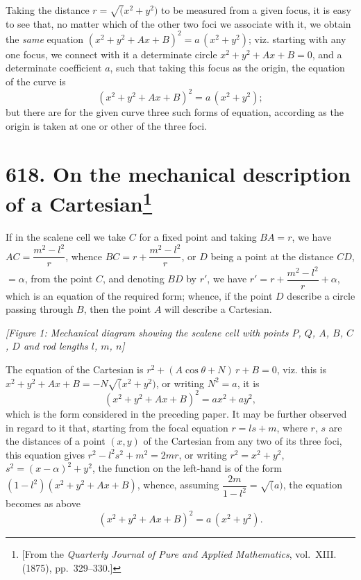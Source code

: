 \documentclass[11pt,a4paper]{article}
\theoremstyle{plain}
\theoremstyle{definition}
\theoremstyle{remark}
\begin{document}
Taking the distance $r = \surd(x^2+y^2)$ to be measured from a given focus, it is easy to see that, no matter which of the other two foci we associate with it, we obtain the \textit{same} equation $(x^2 + y^2 + Ax + B)^2 = a\,(x^2 + y^2)$; viz. starting with any one focus, we connect with it a determinate circle $x^2 + y^2 + Ax + B = 0$, and a determinate coefficient $a$, such that taking this focus as the origin, the equation of the curve is
\[
(x^2 + y^2 + Ax + B)^2 = a\,(x^2 + y^2);
\]
but there are for the given curve three such forms of equation, according as the origin is taken at one or other of the three foci.

\newpage
\section[On the mechanical description of a Cartesian]{\textbf{618.} On the mechanical description of a Cartesian\footnote{[From the \textit{Quarterly Journal of Pure and Applied Mathematics}, vol.~XIII. (1875), pp.~329--330.]}}

If in the scalene cell we take $C$ for a fixed point and taking $BA = r$, we have $AC = \dfrac{m^2-l^2}{r}$, whence $BC = r + \dfrac{m^2-l^2}{r}$, or $D$ being a point at the distance $CD$, $= \alpha$, from the point $C$, and denoting $BD$ by $r'$, we have $r' = r + \dfrac{m^2-l^2}{r} + \alpha$, which is an equation of the required form; whence, if the point $D$ describe a circle passing through $B$, then the point $A$ will describe a Cartesian.

\begin{center}
\textit{[Figure 1: Mechanical diagram showing the scalene cell with points $P$, $Q$, $A$, $B$, $C$, $D$ and rod lengths $l$, $m$, $n$]}
\end{center}

The equation of the Cartesian is $r^2 + (A\cos\theta + N)\,r + B = 0$, viz. this is $x^2 + y^2 + Ax + B = -N\surd(x^2+y^2)$, or writing $N^2 = a$, it is
\[
(x^2 + y^2 + Ax + B)^2 = ax^2 + ay^2,
\]
which is the form considered in the preceding paper. It may be further observed in regard to it that, starting from the focal equation $r = ls + m$, where $r$, $s$ are the distances of a point $(x, y)$ of the Cartesian from any two of its three foci, this equation gives $r^2 - l^2s^2 + m^2 = 2mr$, or writing $r^2 = x^2 + y^2$, $s^2 = (x-\alpha)^2 + y^2$, the function on the left-hand is of the form $(1-l^2)(x^2 + y^2 + Ax + B)$, whence, assuming $\dfrac{2m}{1-l^2} = \surd(a)$, the equation becomes as above
\[
(x^2 + y^2 + Ax + B)^2 = a\,(x^2 + y^2).
\]
\end{document}
